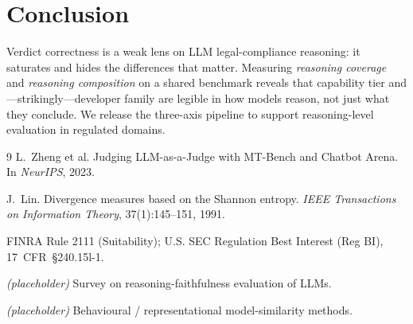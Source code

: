 \documentclass{article}
\begin{document}
\section{Conclusion}

Verdict correctness is a weak lens on LLM legal-compliance reasoning: it saturates and hides the
differences that matter. Measuring \emph{reasoning coverage} and \emph{reasoning composition} on
a shared benchmark reveals that capability tier and---strikingly---developer family are legible
in how models reason, not just what they conclude. We release the three-axis pipeline to support
reasoning-level evaluation in regulated domains.

\begin{thebibliography}{9}
L.~Zheng et al.
\newblock Judging {LLM}-as-a-{J}udge with {MT}-{B}ench and {C}hatbot {A}rena.
\newblock In \emph{NeurIPS}, 2023.

J.~Lin.
\newblock Divergence measures based on the {S}hannon entropy.
\newblock \emph{IEEE Transactions on Information Theory}, 37(1):145--151, 1991.

FINRA Rule 2111 (Suitability); U.S. SEC Regulation Best Interest (Reg BI),
17~CFR~\S240.15l-1.

\emph{(placeholder)} Survey on reasoning-faithfulness evaluation of LLMs.

\emph{(placeholder)} Behavioural / representational model-similarity methods.
\end{thebibliography}

\appendix
\end{document}
